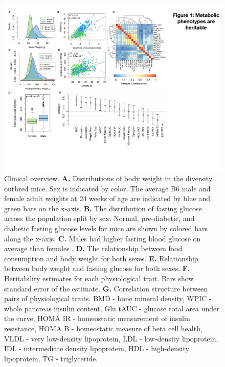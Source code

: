 \documentclass[
]{article}
\providecommand{\DIFaddtex}[1]{{\protect\color{blue}\uwave{#1}}} %
\providecommand{\DIFaddFL}[1]{\DIFadd{#1}} %
\providecommand{\DIFaddbeginFL}{} %
\providecommand{\DIFaddendFL}{} %
\providecommand{\DIFadd}[1]{\texorpdfstring{\DIFaddtex{#1}}{#1}} %
\newcommand{\DIFaddincludegraphics}[2][]{{\color{blue}\fbox{\DIFOincludegraphics[#1]{#2}}}} %
\DeclareRobustCommand{\DIFaddbeginFL}{\DIFOaddbeginFL \let\includegraphics\DIFaddincludegraphics} %
\DeclareRobustCommand{\DIFaddendFL}{\DIFOaddendFL \let\includegraphics\DIFOincludegraphics} %
\begin{document}
\begin{figure}[ht!]
\includegraphics[width=\textwidth]{Figures/Fig1_trait_overview.pdf} 
\caption{Clinical overview. \textbf{A.} Distributions of 
\DIFaddbeginFL \DIFaddFL{final }\DIFaddendFL body weight in the diversity outbred mice. Sex is indicated by 
color. The average B6 male and female adult weights at 24 weeks of 
age are indicated by blue and green bars on the x-axis. \textbf{B.} 
The distribution of \DIFaddbeginFL \DIFaddFL{final }\DIFaddendFL fasting glucose across the population split 
by sex. Normal, pre-diabetic, and diabetic fasting glucose levels 
for mice are shown by colored bars along the x-axis. \textbf{C.} 
Males had higher fasting blood glucose on average than females 
\DIFaddbeginFL \DIFaddFL{($p = 9.1\times10^{-15}$)}\DIFaddendFL . \textbf{D.} The relationship between 
food consumption and body weight for both sexes. \textbf{E.} 
Relationship between body weight and fasting glucose for both 
sexes. \textbf{F.} Heritability estimates for each physiological 
trait. Bars show standard error of the estimate. \textbf{G.} 
Correlation structure between pairs of physiological traits.
BMD - bone mineral density, WPIC - whole pancreas insulin content, 
Glu tAUC - glucose total area under the curve, HOMA IR - homeostatic 
measurement of insulin resistance, HOMA B - homeostatic measure of 
beta cell health, VLDL - very low-density lipoprotein,
LDL - low-density lipoprotein, IDL - intermediate density lipoprotein, 
HDL - high-density lipoprotein, TG - triglyceride.
}
\label{fig:trait_overview}
\end{figure}
\end{document}
